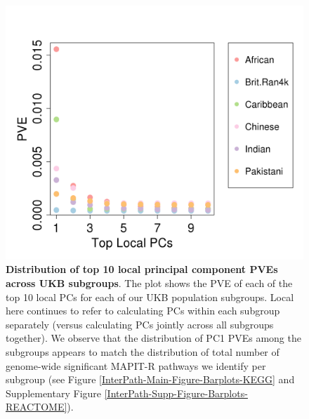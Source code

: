 \begin{figure}[htb]
\centering
\includegraphics[scale=.45]{Images/Main/InterPath_Main_Figure_Eigenvalues_vs2.png}
\caption[TBD]{\textbf{Distribution of top 10 local principal component PVEs across UKB subgroups}. The plot shows the PVE of each of the top 10 local PCs for each of our UKB population subgroups. Local here continues to refer to calculating PCs within each subgroup separately (versus calculating PCs jointly across all subgroups together). We observe that the distribution of PC1 PVEs among the subgroups appears to match the distribution of total number of genome-wide significant MAPIT-R pathways we identify per subgroup (see Figure \ref{InterPath-Main-Figure-Barplots-KEGG} and  Supplementary Figure \ref{InterPath-Supp-Figure-Barplots-REACTOME}).}
\label{InterPath-Main-Figure-Eigenvalues}
\end{figure}


